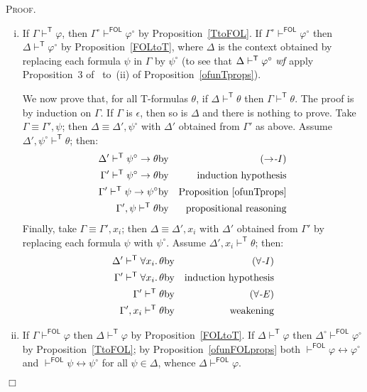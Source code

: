 \documentclass{article}
\newenvironment{proof}{\smallskip\textsc{Proof.}}{\hspace*{\fill}$\Box$}
\newcommand{\T}{\textsf T}
\newcommand{\ofun}[1]{\ensuremath{{#1}^\circ}}
\newcommand{\wf}{\ \mbox{\em wf}}
\newcommand{\myvdash}[1]{\ensuremath{\vdash^{\mathsf{#1}}}}
\def\sep{.\,}
\begin{document}
\begin{proof}
\begin{enumerate}[(i)]
\item If $\Gamma\myvdash{T}\varphi$, then
$\ofun\Gamma\myvdash{FOL}\ofun\varphi$ by Proposition~\ref{TtoFOL}.
If $\ofun\Gamma\myvdash{FOL}\ofun\varphi$ then
$\Delta\myvdash{T}\ofun\varphi$ by Proposition~\ref{FOLtoT}, where $\Delta$
is the context obtained by replacing each formula $\psi$ in $\Gamma$ by
$\ofun\psi$ (to see that $\Delta\myvdash{T}\ofun\varphi\wf$ apply
Proposition~3 of~\cite{wie:zwa:03} to~(ii) of Proposition~\ref{ofunTprops}).

We now prove that, for all {\T}-formulas $\theta$, if
$\Delta\myvdash{T}\theta$ then $\Gamma\myvdash{T}\theta$.  The proof
is by induction on $\Gamma$.  If $\Gamma$ is $\epsilon$, then so is
$\Delta$ and there is nothing to prove.
Take $\Gamma\equiv\Gamma',\psi$; then
$\Delta\equiv\Delta',\ofun\psi$ with $\Delta'$ obtained from $\Gamma'$ as
above.  Assume $\Delta',\ofun\psi\myvdash{T}\theta$; then:
\begin{eqnarray*}
\Delta'\myvdash{T}\ofun\psi\to\theta & \mbox{by} &
  \mbox{(\emph{$\to$-I})} \\
\Gamma'\myvdash{T}\ofun\psi\to\theta & \mbox{by} &
  \mbox{induction hypothesis} \\
\Gamma'\myvdash{T}\psi\to\ofun\psi & \mbox{by} &
  \mbox{Proposition~\ref{ofunTprops}} \\
\Gamma',\psi\myvdash{T}\theta & \mbox{by} &
  \mbox{propositional reasoning}
\end{eqnarray*}
Finally, take $\Gamma\equiv\Gamma',x_i$; then $\Delta\equiv\Delta',x_i$ with
$\Delta'$ obtained from $\Gamma'$ by replacing each formula $\psi$ with
$\ofun\psi$.  Assume $\Delta',x_i\myvdash{T}\theta$; then:
\begin{eqnarray*}
\Delta'\myvdash{T}\forall x_i\sep\theta & \mbox{by} &
  \mbox{(\emph{$\forall$-I})} \\
\Gamma'\myvdash{T}\forall x_i\sep\theta & \mbox{by} &
  \mbox{induction hypothesis} \\
\Gamma'\myvdash{T}\theta & \mbox{by} &
  \mbox{(\emph{$\forall$-E})} \\
\Gamma',x_i\myvdash{T}\theta & \mbox{by} &
  \mbox{weakening}
\end{eqnarray*}
\item If $\Gamma\myvdash{FOL}\varphi$ then $\Delta\myvdash{T}\varphi$ by
Proposition~\ref{FOLtoT}.  If $\Delta\myvdash{T}\varphi$ then
$\ofun\Delta\myvdash{FOL}\ofun\varphi$ by Proposition~\ref{TtoFOL};
by Proposition~\ref{ofunFOLprops}
both $\myvdash{FOL}\varphi\leftrightarrow\ofun\varphi$
and $\myvdash{FOL}\psi\leftrightarrow\ofun\psi$ for all $\psi\in\Delta$,
whence $\Delta\myvdash{FOL}\varphi$.
\end{enumerate}
\end{proof}
\end{document}

